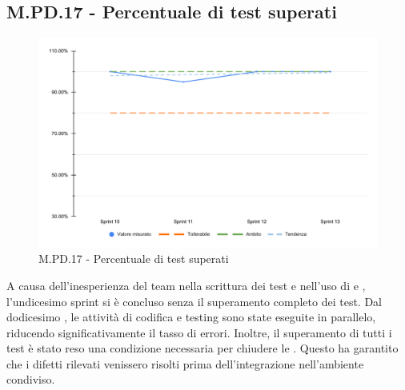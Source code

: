 \subsection{M.PD.17 - Percentuale di test superati}

\begin{figure}[H]
  \centering
  \includegraphics[width=\textwidth]{assets/test_superati.pdf}
  \caption{M.PD.17 - Percentuale di test superati}
\end{figure}

\par A causa dell'inesperienza del team nella scrittura dei test e nell'uso di  e , l'undicesimo sprint si è concluso senza il superamento completo dei test. Dal dodicesimo , le attività di codifica e testing sono state eseguite in parallelo, riducendo significativamente il tasso di errori. Inoltre, il superamento di tutti i test è stato reso una condizione necessaria per chiudere le . Questo ha garantito che i difetti rilevati venissero risolti prima dell'integrazione nell'ambiente condiviso.
